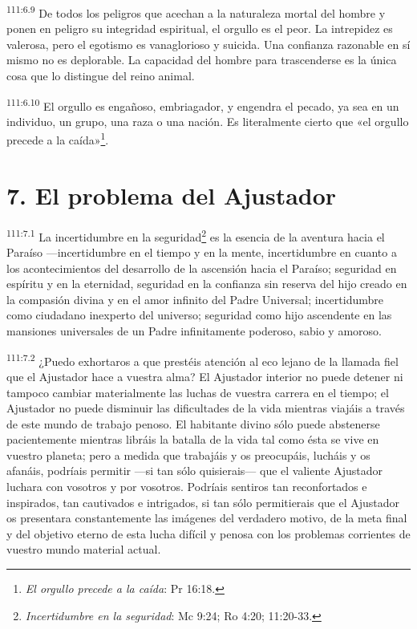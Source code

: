 \par
\textsuperscript{111:6.9} De todos los peligros que acechan a la naturaleza mortal del hombre y ponen en peligro su integridad espiritual, el orgullo es el peor. La intrepidez es valerosa, pero el egotismo es vanaglorioso y suicida. Una confianza razonable en sí mismo no es deplorable. La capacidad del hombre para trascenderse es la única cosa que lo distingue del reino animal.

\par
\textsuperscript{111:6.10} El orgullo es engañoso, embriagador, y engendra el pecado, ya sea en un individuo, un grupo, una raza o una nación. Es literalmente cierto que «el orgullo precede a la caída»\footnote{\textit{El orgullo precede a la caída}: Pr 16:18.}.

\section*{7. El problema del Ajustador}
\par
\textsuperscript{111:7.1} La incertidumbre en la seguridad\footnote{\textit{Incertidumbre en la seguridad}: Mc 9:24; Ro 4:20; 11:20-33.} es la esencia de la aventura hacia el Paraíso ---incertidumbre en el tiempo y en la mente, incertidumbre en cuanto a los acontecimientos del desarrollo de la ascensión hacia el Paraíso; seguridad en espíritu y en la eternidad, seguridad en la confianza sin reserva del hijo creado en la compasión divina y en el amor infinito del Padre Universal; incertidumbre como ciudadano inexperto del universo; seguridad como hijo ascendente en las mansiones universales de un Padre infinitamente poderoso, sabio y amoroso.

\par
\textsuperscript{111:7.2} ¿Puedo exhortaros a que prestéis atención al eco lejano de la llamada fiel que el Ajustador hace a vuestra alma? El Ajustador interior no puede detener ni tampoco cambiar materialmente las luchas de vuestra carrera en el tiempo; el Ajustador no puede disminuir las dificultades de la vida mientras viajáis a través de este mundo de trabajo penoso. El habitante divino sólo puede abstenerse pacientemente mientras libráis la batalla de la vida tal como ésta se vive en vuestro planeta; pero a medida que trabajáis y os preocupáis, lucháis y os afanáis, podríais permitir ---si tan sólo quisierais--- que el valiente Ajustador luchara con vosotros y por vosotros. Podríais sentiros tan reconfortados e inspirados, tan cautivados e intrigados, si tan sólo permitierais que el Ajustador os presentara constantemente las imágenes del verdadero motivo, de la meta final y del objetivo eterno de esta lucha difícil y penosa con los problemas corrientes de vuestro mundo material actual.

